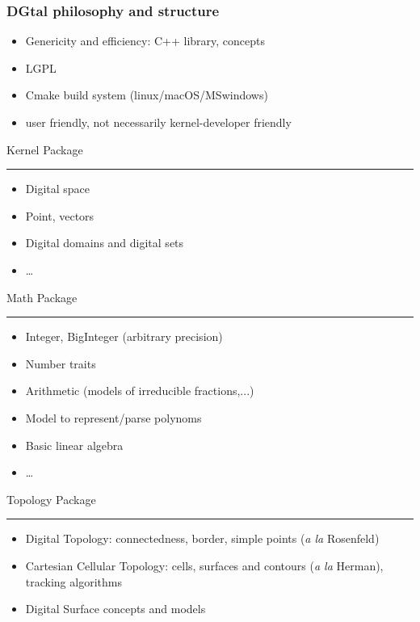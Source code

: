 \documentclass[8pt]{beamer}
\newcommand{\HH}{ \vspace{0.5pt}\hrule}
\begin{document}
\begin{frame}%
  \frametitle{DGtal philosophy and structure}

  \begin{block}{}
    \small
    \begin{itemize}
    \item  Genericity and efficiency: C++ library, concepts
    \item  LGPL
    \item Cmake build system (linux/macOS/MSwindows)
    \item user friendly, not necessarily kernel-developer friendly
    \end{itemize}
  \end{block} 
  \begin{alertblock}{\centering Kernel Package\HH}
            \small
          \begin{itemize}
          \item Digital space
          \item  Point, vectors
            \item Digital domains and digital sets
             \item  \ldots  
          \end{itemize}
       
   \end{alertblock}

  \begin{alertblock}{\centering Math Package\HH}
    \footnotesize
    \begin{itemize}
    \item Integer, BigInteger (arbitrary precision)
    \item Number traits
    \item Arithmetic (models of irreducible fractions,...)
    \item Model to represent/parse polynoms
    \item Basic linear algebra
    \item \ldots
    \end{itemize}
  \end{alertblock}


  \begin{alertblock}{\centering Topology Package\HH}
    \small
       \begin{itemize}
    \item Digital Topology: connectedness, border, simple points
      (\emph{a la} Rosenfeld)
    \item Cartesian Cellular Topology: cells,  surfaces and contours
      (\emph{a la} Herman), tracking algorithms
    \item Digital Surface concepts and models
    \end{itemize}
  \end{alertblock}
\end{frame}
\end{document}
